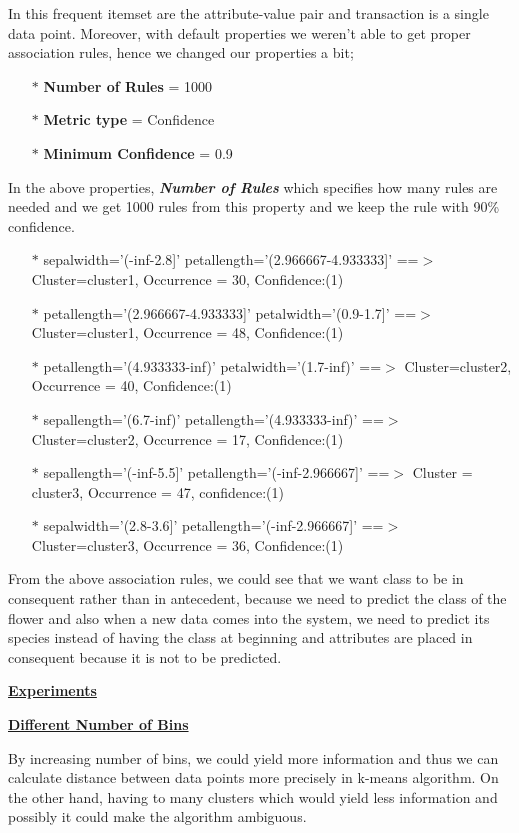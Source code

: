 \documentclass[a4paper,10pt]{article}
\begin{document}
In this frequent itemset are the attribute-value pair and transaction is a single data point. Moreover, with 
default properties we weren't able to get proper association rules, hence we changed our properties a bit;
\begin{enumerate}
  \item [$*$] \textbf{Number of Rules} = 1000
  \item [$*$] \textbf{Metric type} = Confidence
  \item [$*$] \textbf{Minimum Confidence} = 0.9
\end{enumerate}
In the above properties, \textbf{\textit{Number of Rules}} which specifies how many rules are needed and we get
1000 rules from this property and we keep the rule with 90\% confidence.
\begin{enumerate}     
  \item [$*$] sepalwidth='(-inf-2.8]' petallength='(2.966667-4.933333]' ==$>$ Cluster=cluster1, Occurrence = 30, Confidence:(1)
  \item [$*$] petallength='(2.966667-4.933333]' petalwidth='(0.9-1.7]' ==$>$ Cluster=cluster1, Occurrence = 48, Confidence:(1)
  \item [$*$] petallength='(4.933333-inf)' petalwidth='(1.7-inf)' ==$>$ Cluster=cluster2, Occurrence = 40, Confidence:(1)
  \item [$*$] sepallength='(6.7-inf)' petallength='(4.933333-inf)' ==$>$ Cluster=cluster2, Occurrence = 17, Confidence:(1)
  \item [$*$] sepallength='(-inf-5.5]' petallength='(-inf-2.966667]' ==$>$ Cluster = cluster3, Occurrence = 47, confidence:(1)
  \item [$*$] sepalwidth='(2.8-3.6]' petallength='(-inf-2.966667]' ==$>$ Cluster=cluster3, Occurrence = 36, Confidence:(1)
\end{enumerate}
\par
From the above association rules, we could see that we want class to be in consequent rather than in antecedent, because
we need to predict the class of the flower and also when a new data comes into the system, we need to predict its species
instead of having the class at beginning and attributes are placed in consequent because it is not to be predicted. \par
\textbf{\underline{Experiments}} \par
\textbf{\underline{Different Number of Bins}} \par
By increasing number of bins, we could yield more information and thus we can calculate distance between data points 
more precisely in k-means algorithm. On the other hand, having to many clusters which would yield less information and
possibly it could make the algorithm ambiguous. 
\end{document}
